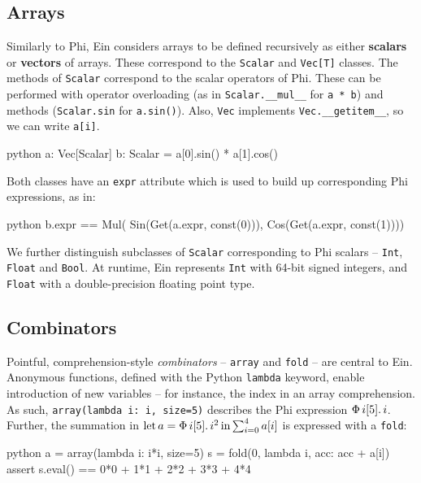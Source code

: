 \subsection{Arrays}

Similarly to Phi, Ein considers arrays to be defined recursively as either \textbf{scalars} or \textbf{vectors} of arrays. These correspond to the \texttt{Scalar} and \texttt{Vec[T]} classes. The methods of \texttt{Scalar} correspond to the scalar operators of Phi. These can be performed with operator overloading (as in \texttt{Scalar.\_\_mul\_\_} for \texttt{a * b}) and methods (\texttt{Scalar.sin} for \texttt{a.sin()}). Also, \texttt{Vec} implements \texttt{Vec.\_\_getitem\_\_}, so we can write \texttt{a[i]}. 
\begin{center}
\begin{cminted}{python}
a: Vec[Scalar]
b: Scalar = a[0].sin() * a[1].cos()
\end{cminted}
\end{center}
Both classes have an \texttt{expr} attribute which is used to build up corresponding Phi expressions, as in: 
\begin{center}
\begin{cminted}{python}
b.expr == Mul(
    Sin(Get(a.expr, const(0))), 
    Cos(Get(a.expr, const(1))))
\end{cminted}
\end{center}

We further distinguish subclasses of \texttt{Scalar} corresponding to Phi scalars -- \texttt{Int}, \texttt{Float} and \texttt{Bool}. At runtime, Ein represents \texttt{Int} with 64-bit signed integers, and \texttt{Float} with a double-precision floating point type.  

\subsection{Combinators}

Pointful, comprehension-style \textit{combinators} -- \texttt{array} and \texttt{fold} -- are central to Ein. Anonymous functions, defined with the Python \texttt{lambda} keyword, enable introduction of new variables -- for instance, the index in an array comprehension. As such, \texttt{array(lambda i: i, size=5)} describes the Phi expression $\Phi\, {i}[{5}] \ldotp {i}$. Further, the summation in $\mathrm{let}\,{a}={\Phi\, {i}[{5}] \ldotp {i^2}}\,\mathrm{in}\,{ \sum_{i=0}^{4} a[i]}$ is expressed with a \texttt{fold}:
\begin{center}
\begin{cminted}{python}
a = array(lambda i: i*i, size=5)
s = fold(0, lambda i, acc: acc + a[i])
assert s.eval() == 0*0 + 1*1 + 2*2 + 3*3 + 4*4
\end{cminted}
\end{center}

